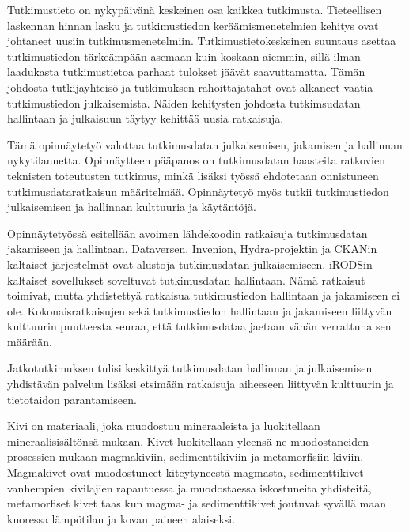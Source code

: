 Tutkimustieto on nykyp{\"a}iv{\"a}n{\"a} keskeinen osa kaikkea tutkimusta. Tieteellisen
laskennan hinnan lasku ja tutkimustiedon ker{\"a}{\"a}mismenetelmien kehitys ovat johtaneet
uusiin tutkimusmenetelmiin. Tutkimustietokeskeinen suuntaus asettaa
tutkimustiedon t{\"a}rke{\"a}mp{\"a}{\"a}n asemaan kuin koskaan aiemmin, sill{\"a} ilman
laadukasta tutkimustietoa parhaat tulokset j{\"a}{\"a}v{\"a}t saavuttamatta.
T{\"a}m{\"a}n johdosta tutkijayhteis{\"o} ja tutkimuksen rahoittajatahot ovat
alkaneet vaatia tutkimustiedon julkaisemista. N{\"a}iden kehitysten johdosta
tutkimsudatan hallintaan ja julkaisuun t{\"a}ytyy kehitt{\"a}{\"a} uusia ratkaisuja.

T{\"a}m{\"a} opinn{\"a}ytety{\"o} valottaa tutkimusdatan julkaisemisen, jakamisen ja
hallinnan nykytilannetta. Opinn{\"a}ytteen p{\"a}{\"a}panos on tutkimusdatan
haasteita ratkovien teknisten toteutusten tutkimus, mink{\"a} lis{\"a}ksi ty{\"o}ss{\"a}
ehdotetaan onnistuneen tutkimusdataratkaisun m{\"a}{\"a}ritelm{\"a}{\"a}. Opinn{\"a}ytety{\"o}
my{\"o}s tutkii tutkimustiedon julkaisemisen ja hallinnan kulttuuria ja
k{\"a}yt{\"a}nt{\"o}j{\"a}.

Opinn{\"a}ytety{\"o}ss{\"a} esitell{\"a}{\"a}n avoimen l{\"a}hdekoodin ratkaisuja
tutkimusdatan jakamiseen ja hallintaan. Dataversen, Invenion, Hydra-projektin
ja CKANin kaltaiset j{\"a}rjestelm{\"a}t ovat alustoja tutkimusdatan julkaisemiseen.
iRODSin kaltaiset sovellukset soveltuvat tutkimusdatan hallintaan. N{\"a}m{\"a}
ratkaisut toimivat, mutta yhdistetty{\"a} ratkaisua tutkimustiedon hallintaan
ja jakamiseen ei ole. Kokonaisratkaisujen sek{\"a} tutkimustiedon
hallintaan ja jakamiseen liittyv{\"a}n kulttuurin puutteesta seuraa, ett{\"a}
tutkimusdataa jaetaan v{\"a}h{\"a}n verrattuna sen m{\"a}{\"a}r{\"a}{\"a}n.

Jatkotutkimuksen tulisi keskitty{\"a} tutkimusdatan hallinnan ja julkaisemisen
yhdist{\"a}v{\"a}n palvelun lis{\"a}ksi etsim{\"a}{\"a}n ratkaisuja aiheeseen liittyv{\"a}n kulttuurin ja
tietotaidon parantamiseen.

\iffalse
Kivi on materiaali, joka muodostuu mineraaleista ja luokitellaan
mineraalisis{\"a}lt{\"o}ns{\"a} mukaan. Kivet luokitellaan yleens{\"a} ne muodostaneiden
prosessien mukaan magmakiviin, sedimenttikiviin ja metamorfisiin kiviin.
Magmakivet ovat muodostuneet kiteytyneest{\"a} magmasta, sedimenttikivet vanhempien
kivilajien rapautuessa ja muodostaessa iskostuneita yhdisteit{\"a}, metamorfiset
kivet taas kun magma- ja sedimenttikivet joutuvat syv{\"a}ll{\"a} maan kuoressa
l{\"a}mp{\"o}tilan ja kovan paineen alaiseksi.


